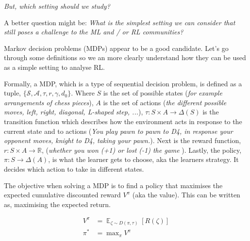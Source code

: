 \begin{displayquote}
  \textsl{But, which setting should we study?\footnotemark}
\end{displayquote}


\begin{displayquote}
  A better question might be: \textsl{What is the simplest setting we can
  consider that still poses a challenge to the ML and / or RL communities?}
\end{displayquote}

Markov decision problems (MDPs) appear to be a good candidate. Let's go through some definitions so we an more clearly understand how they can be used as a
simple setting to analyse RL.

Formally, a MDP, which is a type of sequential decision problem, is defined
as a tuple, $\{\mathcal S, \mathcal A, \tau,r, \gamma, d_0\}$.
Where $S$ is the set of possible states (\textit{for example arrangements of chess pieces}),
$A$ is the set of actions (\textit{the different possible moves, left,
right, diagonal, L-shaped step, ...}),  $\tau: S \times A \to \Delta(S)$\footnotemark
is the transition function which describes how the environment acts in response
to the current state and to actions (\textit{You play pawn to pawn to D4, in response your
opponent moves, knight to D4, taking your pawn.}). Next is the reward function, $r: S\times A \to \mathbb R$,
(\textit{whether you won (+1) or lost (-1) the game }).
Lastly, the policy, $\pi: S \to \Delta(A)$, is what the learner gets to choose, aka the learners strategy.
It decides which action to take in different states.


\vspace{5mm}

The objective when solving a MDP is to find a policy
that maximises the expected cumulative discounted reward $V^{\pi}$ (aka the value). This
can be written as, maximising the expected return.

\begin{align*}
V^{\pi} &= \mathop{\mathbb E}_{\zeta \sim D(\pi, \tau)} [R(\zeta)] \tag{state value}\label{state-value}\\
\pi^{* } &= \mathop{\text{max}}_{\pi}V^{\pi}
\end{align*}


